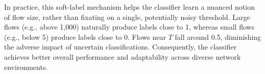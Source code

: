 In practice, this soft-label mechanism helps the classifier learn a nuanced notion of flow size, rather than fixating on a single, potentially noisy threshold. Large flows (e.g., above 1,000) naturally produce labels close to 1, whereas small flows (e.g., below 5) produce labels close to 0. Flows near \(T\) fall around 0.5, diminishing the adverse impact of uncertain classifications. Consequently, the classifier achieves better overall performance and adaptability across diverse network environments.






